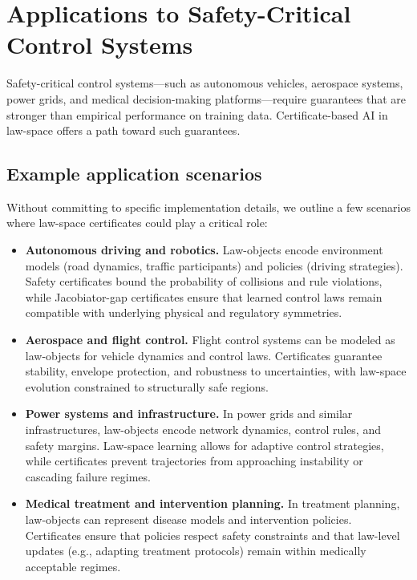 \documentclass[11pt]{book}
\theoremstyle{plain}
\theoremstyle{definition}
\theoremstyle{remark}
\begin{document}
\section{Applications to Safety-Critical Control Systems}
\label{sec:applications-safety-critical}


Safety-critical control systems—such as autonomous vehicles,
aerospace systems, power grids, and medical decision-making
platforms—require guarantees that are stronger than empirical
performance on training data. Certificate-based AI in law-space
offers a path toward such guarantees.

\subsection*{Example application scenarios}

Without committing to specific implementation details, we outline a
few scenarios where law-space certificates could play a critical
role:

\begin{itemize}
  \item \textbf{Autonomous driving and robotics.}
        Law-objects encode environment models (road dynamics,
        traffic participants) and policies (driving strategies).
        Safety certificates bound the probability of collisions and
        rule violations, while Jacobiator-gap certificates ensure
        that learned control laws remain compatible with underlying
        physical and regulatory symmetries.
  \item \textbf{Aerospace and flight control.}
        Flight control systems can be modeled as law-objects for
        vehicle dynamics and control laws. Certificates guarantee
        stability, envelope protection, and robustness to
        uncertainties, with law-space evolution constrained to
        structurally safe regions.
  \item \textbf{Power systems and infrastructure.}
        In power grids and similar infrastructures, law-objects
        encode network dynamics, control rules, and safety margins.
        Law-space learning allows for adaptive control strategies,
        while certificates prevent trajectories from approaching
        instability or cascading failure regimes.
  \item \textbf{Medical treatment and intervention planning.}
        In treatment planning, law-objects can represent disease
        models and intervention policies. Certificates ensure that
        policies respect safety constraints and that law-level
        updates (e.g., adapting treatment protocols) remain within
        medically acceptable regimes.
\end{itemize}
\end{document}

